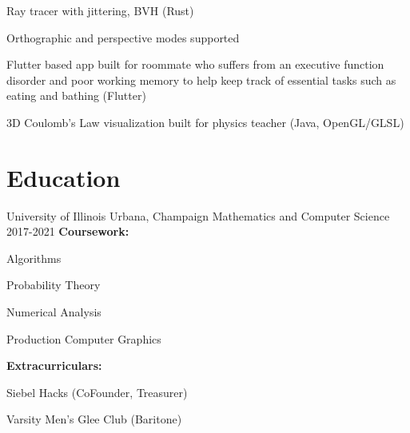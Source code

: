 \documentclass[hidelinks, 11pt]{scrartcl}
\begin{document}
{
    \item Ray tracer with jittering, BVH (Rust)
    \item Orthographic and perspective modes supported
}

{
    \item Flutter based app built for roommate who suffers from an executive 
        function disorder and poor working memory to help keep track of essential 
        tasks such as eating and bathing (Flutter)
}
%
{
    \item 3D Coulomb's Law visualization built for physics teacher (Java, OpenGL/GLSL)
}





\section{Education}
\school
{University of Illinois}
{Urbana, Champaign}
{Mathematics and Computer Science}
{2017-2021}
\textbf{Coursework:} 
\begin{itemize*}
    \item[] Algorithms
    \item Probability Theory 
    \item Numerical Analysis
    \item Production Computer Graphics
\end{itemize*}

\textbf{Extracurriculars:} 
\begin{itemize*}
    \item[] Siebel Hacks (CoFounder, Treasurer) 
    \item Varsity Men's Glee Club (Baritone)
\end{itemize*}
\end{document}
